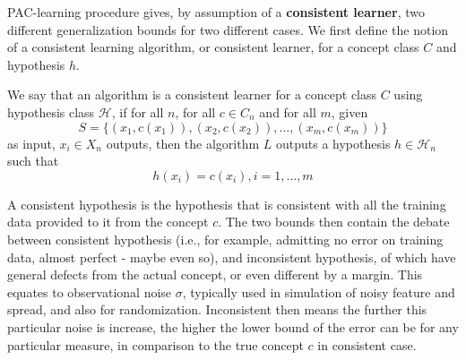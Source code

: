 \documentclass[
  journal=largetwo,
  year=2025,
  volume=37,
]{cup-journal}
\begin{document}
PAC-learning procedure gives, by assumption of a \textbf{consistent learner}, two different generalization bounds for two different cases. We first define the notion of a consistent learning algorithm, or consistent learner, for a concept class $C$ and hypothesis $h$. 
{
    \small
    \begin{definition}
    We say that an algorithm is a consistent learner for a concept class $C$ using hypothesis class $\mathcal{H}$, if for all $n$, for all $c\in C_n$ and for all $m$, given 
    \begin{equation*}
        S = \{ (x_1, c(x_1)) , (x_2, c(x_2)) ,\dots, (x_m, c(x_m))  \} 
    \end{equation*}
    as input, $x_i \in X_n$ outputs, then the algorithm $L$ outputs a hypothesis $h\in \mathcal{H}_n$ such that $$h(x_i) = c(x_i) , i = 1,\dots,m$$ 
    \end{definition}
}
A consistent hypothesis is the hypothesis that is consistent with all the training data provided to it from the concept $c$. The two bounds then contain the debate between consistent hypothesis (i.e., for example, admitting no error on training data, almost perfect - maybe even so), and inconsistent hypothesis, of which have general defects from the actual concept, or even different by a margin. This equates to observational noise $\sigma$, typically used in simulation of noisy feature and spread, and also for randomization. Inconsistent then means the further this particular noise is increase, the higher the lower bound of the error can be for any particular measure, in comparison to the true concept $c$ in consistent case. 
\end{document}
